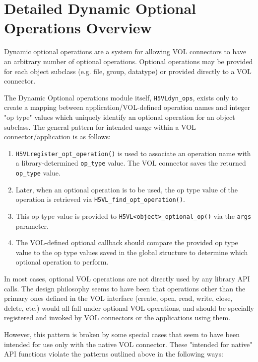 \section{Detailed Dynamic Optional Operations Overview}
\label{app:optionaloperations}

Dynamic optional operations are a system for allowing VOL connectors to have an arbitrary number of optional operations. Optional operations may be provided for each object subclass (e.g. file, group, datatype) or provided directly to a VOL connector.

The Dynamic Optional operations module itself, \texttt{H5VLdyn\_ops}, exists only to create a mapping between application/VOL-defined operation names and integer "op type" values which uniquely identify an optional operation for an object subclass. The general pattern for intended usage within a VOL connector/application is as follows: 


\begin{enumerate}
    \item \texttt{H5VLregister\_opt\_operation()} is used to associate an operation name with a library-determined \texttt{op\_type} value. The VOL connector saves the returned \texttt{op\_type} value.

    \item Later, when an optional operation is to be used, the op type value of the operation is retrieved via \texttt{H5VL\_find\_opt\_operation()}.

    \item This op type value is provided to \texttt{H5VL<object>\_optional\_op()} via the \texttt{args} parameter.

    \item The VOL-defined optional callback should compare the provided op type value to the op type values saved in the global structure to determine which optional operation to perform.
\end{enumerate}

In most cases, optional VOL operations are not directly used by any library API calls. The design philosophy seems to have been that operations other than the primary ones defined in the VOL interface (create, open, read, write, close, delete, etc.) would all fall under optional VOL operations, and should be specially registered and invoked by VOL connectors or the applications using them.

However, this pattern is broken by some special cases that seem to have been intended for use only with the native VOL connector. These "intended for native" API functions violate the patterns outlined above in the following ways:

